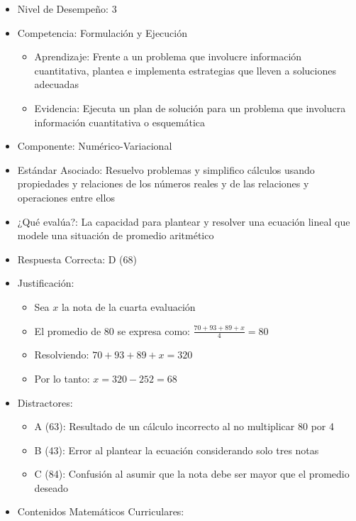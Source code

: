 \documentclass[
]{article}
\providecommand{\tightlist}{%
  \setlength{\itemsep}{0pt}\setlength{\parskip}{0pt}}
\begin{document}
\begin{itemize}
\item
  Nivel de Desempeño: 3
\item
  Competencia: Formulación y Ejecución

  \begin{itemize}
  \tightlist
  \item
    Aprendizaje: Frente a un problema que involucre información
    cuantitativa, plantea e implementa estrategias que lleven a
    soluciones adecuadas
  \item
    Evidencia: Ejecuta un plan de solución para un problema que
    involucra información cuantitativa o esquemática
  \end{itemize}
\item
  Componente: Numérico-Variacional
\item
  Estándar Asociado: Resuelvo problemas y simplifico cálculos usando
  propiedades y relaciones de los números reales y de las relaciones y
  operaciones entre ellos
\item
  ¿Qué evalúa?: La capacidad para plantear y resolver una ecuación
  lineal que modele una situación de promedio aritmético
\item
  Respuesta Correcta: D (68)
\item
  Justificación:

  \begin{itemize}
  \tightlist
  \item
    Sea \(x\) la nota de la cuarta evaluación
  \item
    El promedio de 80 se expresa como:
    \(\frac{70 + 93 + 89 + x}{4} = 80\)
  \item
    Resolviendo: \(70 + 93 + 89 + x = 320\)
  \item
    Por lo tanto: \(x = 320 - 252 = 68\)
  \end{itemize}
\item
  Distractores:

  \begin{itemize}
  \tightlist
  \item
    A (63): Resultado de un cálculo incorrecto al no multiplicar 80 por
    4
  \item
    B (43): Error al plantear la ecuación considerando solo tres notas
  \item
    C (84): Confusión al asumir que la nota debe ser mayor que el
    promedio deseado
  \end{itemize}
\item
  Contenidos Matemáticos Curriculares:


\end{itemize}
\end{document}
